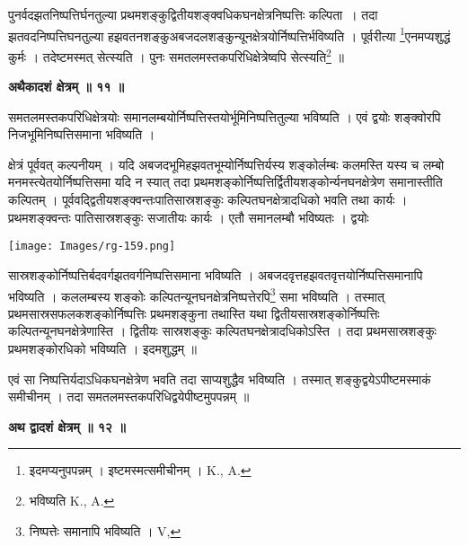 \documentclass[11pt, openany]{book}
\begin{document}
पुनर्वदझतनिष्पत्तिर्घनतुल्या प्रथमशङ्कुद्वितीयशङ्क्वधिकघनक्षेत्रनिष्पत्तिः कल्पिता~। तदा झतवदनिष्पत्तिघनतुल्या हझवतनशङ्कुअबजदलशङ्कुन्यूनक्षेत्रयोर्निष्पत्तिर्भविष्यति । पूर्वरीत्या
\renewcommand{\thefootnote}{४}\footnote{इदमप्यनुपपन्नम् । इष्टमस्मत्समीचीनम् । {\en K., A.}}एनमप्यशुद्धं कुर्मः । तदेष्टमस्मत् सेत्स्यति । पुनः समतलमस्तकपरिधिक्षेत्रेष्वपि सेत्स्यति\renewcommand{\thefootnote}{५}\footnote{भविष्यति {\en K., A.}} ॥ \\
\vspace{3mm}

\begin{center}
\textbf{\large अथैकादशं क्षेत्रम् ॥ ११ ॥ }
\end{center}
\vspace{5mm}

{\ab समतलमस्तकपरिधिक्षेत्रयोः समानलम्बयोर्निष्पत्तिस्तयोर्भूमिनिष्पत्तितुल्या भविष्यति । एवं द्वयोः शङ्क्वोरपि निजभूमिनिष्पत्तिसमाना भविष्यति । }

\newpage
\noindent क्षेत्रं पूर्ववत् कल्पनीयम् । यदि अबजदभूमिहझवतभूम्योर्निष्पत्तिर्यस्य शङ्कोर्लम्बः कलमस्ति यस्य च लम्बो मनमस्त्येतयोर्निष्पत्तिसमा यदि न स्यात् तदा
प्रथमशङ्कोर्निष्पत्तिर्द्वितीयशङ्कोर्न्यनघनक्षेत्रेण समानास्तीति कल्पितम् । पूर्ववद्द्वितीयशङ्क्वन्तःपातिसास्रशङ्कुः कल्पितघनक्षेत्रादधिको भवति तथा कार्यः । प्रथमशङ्क्वन्तः पातिसास्रशङ्कुः सजातीयः कार्यः । एतौ समानलम्बौ भविष्यतः । द्वयोः 
\begin{center}
\texttt{[image: Images/rg-159.png]}  
\end{center}
सास्रशङ्कोर्निष्पत्तिर्बदवर्गझतवर्गनिष्पत्तिसमाना भविष्यति । अबजदवृत्तहझवतवृत्तयोर्निष्पत्तिसमानापि भविष्यति । कललम्बस्य शङ्कोः कल्पितन्यूनघनक्षेत्रनिष्पत्तेरपि\renewcommand{\thefootnote}{१}\footnote{निष्पत्तेः समानापि भविष्यति । {\en V,}} समा भविष्यति । तस्मात्
प्रथमसास्रसफलकशङ्कोर्निष्पत्तिः प्रथमशङ्कुना तथास्ति यथा द्वितीयसास्रशङ्कोर्निष्पत्तिः कल्पितन्यूनघनक्षेत्रेणास्ति । द्वितीयः सास्रशङ्कुः कल्पितघनक्षेत्रादधिकोऽस्ति । तदा प्रथमसास्रशङ्कुः प्रथमशङ्कोरधिको भविष्यति । इदमशुद्धम् ॥ \\
\vspace{5mm}

एवं सा निष्पत्तिर्यदाऽधिकघनक्षेत्रेण भवति तदा साप्यशुद्धैव भविष्यति । तस्मात् शङ्कुद्वयेऽपीष्टमस्माकं समीचीनम् । तदा समतलमस्तकपरिधिद्वयेपीष्टमुपपन्नम् ॥\\
\begin{center}
\textbf{\large अथ द्वादशं क्षेत्रम् ॥ १२ ॥\\}
\end{center}
\vspace{5mm}
\end{document}
